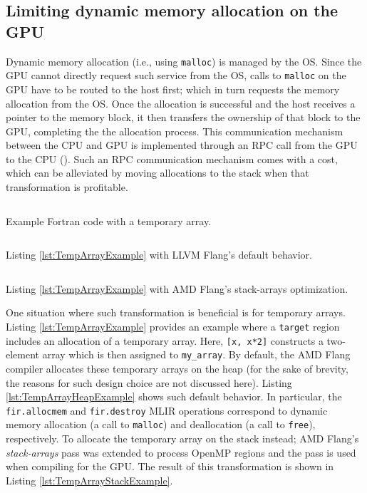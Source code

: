 \documentclass[acmtog,natbib=false]{acmart}
\newcommand{\code}[1]{\texttt{#1}\xspace}
\begin{document}
\subsection{Limiting dynamic memory allocation on the GPU}
Dynamic memory allocation (i.e., using \code{malloc}) is managed by the \ac{OS}.
Since the GPU cannot directly request such service from the \ac{OS}, calls to \code{malloc} on the GPU have to be routed to the host first; which in turn requests the memory allocation from the \ac{OS}.
Once the allocation is successful and the host receives a pointer to the memory block, it then transfers the ownership of that block to the GPU, completing the the allocation process.
This communication mechanism between the CPU and GPU is implemented through an \ac{RPC} call from the GPU to the CPU (\cite{gpulibc}).
Such an \ac{RPC} communication mechanism comes with a cost, which can be alleviated by moving allocations to the stack when that transformation is profitable.

\begin{listing}[t]
\inputminted{Fortran}{code/temp_array.f90}
\caption{Example Fortran code with a temporary array.}
\label{lst:TempArrayExample}
\end{listing}

\begin{listing}[t]
\inputminted{MLIR-lexer.py:MlirLexer -x}{code/temp_array_heap.mlir}
\caption{Listing \ref{lst:TempArrayExample} with LLVM Flang's default behavior.}
\label{lst:TempArrayHeapExample}
\end{listing}

\begin{listing}[t]
\inputminted{MLIR-lexer.py:MlirLexer -x}{code/temp_array_stack.mlir}
\caption{Listing \ref{lst:TempArrayExample} with AMD Flang's stack-arrays optimization.}
\label{lst:TempArrayStackExample}
\end{listing}

One situation where such transformation is beneficial is for temporary arrays.
Listing \ref{lst:TempArrayExample} provides an example where a \code{target} region includes an allocation of a temporary array.
Here, \code{[x, x*2]} constructs a two-element array which is then assigned to \code{my\_array}.
By default, the AMD Flang compiler allocates these temporary arrays on the heap (for the sake of brevity, the reasons for such design choice are not discussed here).
Listing \ref{lst:TempArrayHeapExample} shows such default behavior.
In particular, the \code{fir.allocmem} and \code{fir.destroy} \ac{MLIR} operations correspond to dynamic memory allocation (a call to \code{malloc}) and deallocation (a call to \code{free}), respectively.
To allocate the temporary array on the stack instead; AMD Flang's \textit{stack-arrays} pass was extended to process OpenMP regions and the pass is used when compiling for the GPU.
The result of this transformation is shown in Listing \ref{lst:TempArrayStackExample}.
\end{document}
